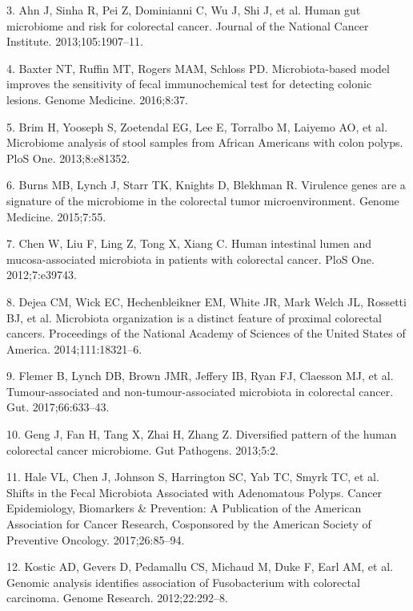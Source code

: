 \documentclass[12pt,]{article}
\begin{document}
\hypertarget{ref-ahn_human_2013}{}
3. Ahn J, Sinha R, Pei Z, Dominianni C, Wu J, Shi J, et al. Human gut
microbiome and risk for colorectal cancer. Journal of the National
Cancer Institute. 2013;105:1907--11.

\hypertarget{ref-baxter_microbiota-based_2016}{}
4. Baxter NT, Ruffin MT, Rogers MAM, Schloss PD. Microbiota-based model
improves the sensitivity of fecal immunochemical test for detecting
colonic lesions. Genome Medicine. 2016;8:37.

\hypertarget{ref-brim_microbiome_2013}{}
5. Brim H, Yooseph S, Zoetendal EG, Lee E, Torralbo M, Laiyemo AO, et
al. Microbiome analysis of stool samples from African Americans with
colon polyps. PloS One. 2013;8:e81352.

\hypertarget{ref-burns_virulence_2015}{}
6. Burns MB, Lynch J, Starr TK, Knights D, Blekhman R. Virulence genes
are a signature of the microbiome in the colorectal tumor
microenvironment. Genome Medicine. 2015;7:55.

\hypertarget{ref-chen_human_2012}{}
7. Chen W, Liu F, Ling Z, Tong X, Xiang C. Human intestinal lumen and
mucosa-associated microbiota in patients with colorectal cancer. PloS
One. 2012;7:e39743.

\hypertarget{ref-dejea_microbiota_2014}{}
8. Dejea CM, Wick EC, Hechenbleikner EM, White JR, Mark Welch JL,
Rossetti BJ, et al. Microbiota organization is a distinct feature of
proximal colorectal cancers. Proceedings of the National Academy of
Sciences of the United States of America. 2014;111:18321--6.

\hypertarget{ref-flemer_tumour-associated_2017}{}
9. Flemer B, Lynch DB, Brown JMR, Jeffery IB, Ryan FJ, Claesson MJ, et
al. Tumour-associated and non-tumour-associated microbiota in colorectal
cancer. Gut. 2017;66:633--43.

\hypertarget{ref-geng_diversified_2013}{}
10. Geng J, Fan H, Tang X, Zhai H, Zhang Z. Diversified pattern of the
human colorectal cancer microbiome. Gut Pathogens. 2013;5:2.

\hypertarget{ref-hale_shifts_2017}{}
11. Hale VL, Chen J, Johnson S, Harrington SC, Yab TC, Smyrk TC, et al.
Shifts in the Fecal Microbiota Associated with Adenomatous Polyps.
Cancer Epidemiology, Biomarkers \& Prevention: A Publication of the
American Association for Cancer Research, Cosponsored by the American
Society of Preventive Oncology. 2017;26:85--94.

\hypertarget{ref-kostic_genomic_2012}{}
12. Kostic AD, Gevers D, Pedamallu CS, Michaud M, Duke F, Earl AM, et
al. Genomic analysis identifies association of Fusobacterium with
colorectal carcinoma. Genome Research. 2012;22:292--8.
\end{document}
